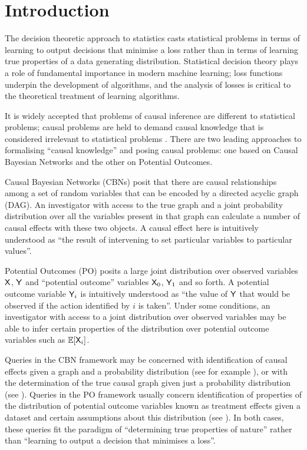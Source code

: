 \section{Introduction}



The decision theoretic approach to statistics casts statistical problems in terms of learning to output decisions that minimise a loss rather than in terms of learning true properties of a data generating distribution. Statistical decision theory plays a role of fundamental importance in modern machine learning; loss functions underpin the development of algorithms, and the analysis of losses is critical to the theoretical treatment of learning algorithms.

It is widely accepted that problems of causal inference are different to statistical problems; causal problems are held to demand causal knowledge that is considered irrelevant to statistical problems \citep{pearl_causality:_2009,cartwright_no_1994}. There are two leading approaches to formalising ``causal knowledge'' and posing causal problems: one based on Causal Bayesian Networks and the other on Potential Outcomes.

Causal Bayesian Networks (CBNs) posit that there are causal relationships among a set of random variables that can be encoded by a directed acyclic graph (DAG). An investigator with access to the true graph and a joint probability distribution over all the variables present in that graph can calculate a number of causal effects with these two objects. A causal effect here is intuitively understood as ``the result of intervening to set particular variables to particular values''.

Potential Outcomes (PO) posits a large joint distribution over observed variables $\mathsf{X}$, $\mathsf{Y}$ and ``potential outcome'' variables $\mathsf{X}_0$, $\mathsf{Y}_1$ and so forth. A potential outcome variable $\mathsf{Y}_i$ is intuitively understood as ``the value of $\mathsf{Y}$ that would be observed if the action identified by $i$ is taken''. Under some conditions, an investigator with access to a joint distribution over observed variables may be able to infer certain properties of the distribution over potential outcome variables such as $\mathbb{E}[\mathsf{X}_i]$.

Queries in the CBN framework may be concerned with identification of causal effects given a graph and a probability distribution (see for example \citep{tian2002general}), or with the determination of the true causal graph given just a probability distribution (see \citep{spirtes_causation_1993}). Queries in the PO framework usually concern identification of properties of the distribution of potential outcome variables known as treatment effects given a dataset and certain assumptions about this distribution (see \citep{rubin_causal_2005,robins2010alternative}). In both cases, these queries fit the paradigm of ``determining true properties of nature'' rather than ``learning to output a decision that minimises a loss''.

